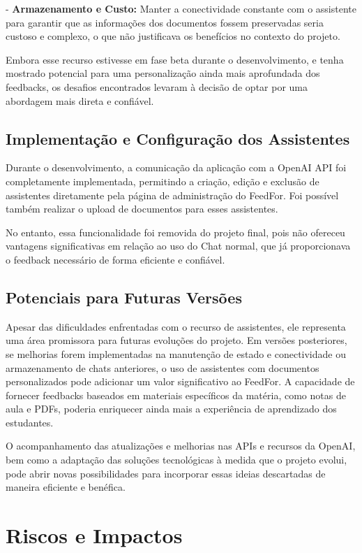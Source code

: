 - \textbf{Armazenamento e Custo:} Manter a conectividade constante com o assistente para garantir que as informações dos documentos fossem preservadas seria custoso e complexo, o que não justificava os benefícios no contexto do projeto.

Embora esse recurso estivesse em fase beta durante o desenvolvimento, e tenha mostrado potencial para uma personalização ainda mais aprofundada dos feedbacks, os desafios encontrados levaram à decisão de optar por uma abordagem mais direta e confiável.

\subsection{Implementação e Configuração dos Assistentes}

Durante o desenvolvimento, a comunicação da aplicação com a OpenAI API foi completamente implementada, permitindo a criação, edição e exclusão de assistentes diretamente pela página de administração do FeedFor. Foi possível também realizar o upload de documentos para esses assistentes.

No entanto, essa funcionalidade foi removida do projeto final, pois não ofereceu vantagens significativas em relação ao uso do Chat normal, que já proporcionava o feedback necessário de forma eficiente e confiável.

\subsection{Potenciais para Futuras Versões}

Apesar das dificuldades enfrentadas com o recurso de assistentes, ele representa uma área promissora para futuras evoluções do projeto. Em versões posteriores, se melhorias forem implementadas na manutenção de estado e conectividade ou armazenamento de chats anteriores, o uso de assistentes com documentos personalizados pode adicionar um valor significativo ao FeedFor. A capacidade de fornecer feedbacks baseados em materiais específicos da matéria, como notas de aula e PDFs, poderia enriquecer ainda mais a experiência de aprendizado dos estudantes.

O acompanhamento das atualizações e melhorias nas APIs e recursos da OpenAI, bem como a adaptação das soluções tecnológicas à medida que o projeto evolui, pode abrir novas possibilidades para incorporar essas ideias descartadas de maneira eficiente e benéfica.

\section{Riscos e Impactos}


